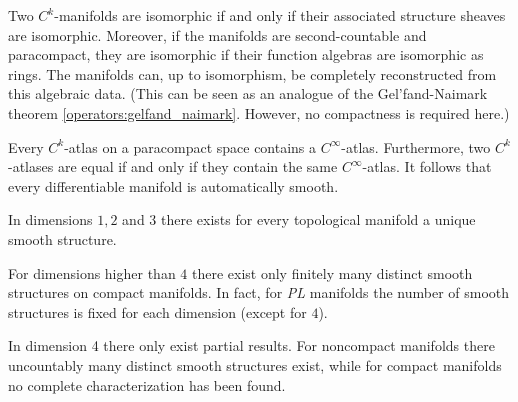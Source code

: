     \begin{property}
        Two $C^k$-manifolds are isomorphic if and only if their associated structure sheaves are isomorphic. Moreover, if the manifolds are second-countable and paracompact, they are isomorphic if their function algebras are isomorphic as rings. The manifolds can, up to isomorphism, be completely reconstructed from this algebraic data. (This can be seen as an analogue of the Gel'fand-Naimark theorem \ref{operators:gelfand_naimark}. However, no compactness is required here.)
    \end{property}

    \begin{theorem}[Whitney]
        Every $C^k$-atlas on a paracompact space contains a $C^\infty$-atlas. Furthermore, two $C^k$-atlases are equal if and only if they contain the same $C^\infty$-atlas. It follows that every differentiable manifold is automatically smooth.
    \end{theorem}

    \begin{theorem}\label{manifold:rado_moise}
        In dimensions $1,2$ and $3$ there exists for every topological manifold a unique smooth structure.
    \end{theorem}
    \begin{theorem}
        For dimensions higher than $4$ there exist only finitely many distinct smooth structures on compact manifolds. In fact, for \textit{PL} manifolds the number of smooth structures is fixed for each dimension (except for $4$).
    \end{theorem}
    \begin{remark}\label{manifold:dim4}
        In dimension 4 there only exist partial results. For noncompact manifolds there uncountably many distinct smooth structures exist, while for compact manifolds no complete characterization has been found.
    \end{remark}


